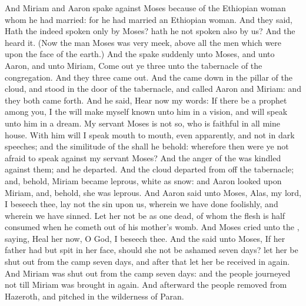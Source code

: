\begin{biblechapter} %
 And Miriam and Aaron spake against Moses because of the Ethiopian woman whom he had married: for he had married an Ethiopian woman.
\verse And they said, Hath the \LORD indeed spoken only by Moses? hath he not spoken also by us? And the \LORD heard it.
\verse (Now the man Moses was very meek, above all the men which were upon the face of the earth.)
\verse And the \LORD spake suddenly unto Moses, and unto Aaron, and unto Miriam, Come out ye three unto the tabernacle of the congregation. And they three came out.
\verse And the \LORD came down in the pillar of the cloud, and stood in the door of the tabernacle, and called Aaron and Miriam: and they both came forth.
\verse And he said, Hear now my words: If there be a prophet among you, I the \LORD will make myself known unto him in a vision, and will speak unto him in a dream.
\verse My servant Moses is not so, who is faithful in all mine house.
\verse With him will I speak mouth to mouth, even apparently, and not in dark speeches; and the similitude of the \LORD shall he behold: wherefore then were ye not afraid to speak against my servant Moses?
\verse And the anger of the \LORD was kindled against them; and he departed.
\verse And the cloud departed from off the tabernacle; and, behold, Miriam became leprous, white as snow: and Aaron looked upon Miriam, and, behold, she was leprous.
\verse And Aaron said unto Moses, Alas, my lord, I beseech thee, lay not the sin upon us, wherein we have done foolishly, and wherein we have sinned.
\verse Let her not be as one dead, of whom the flesh is half consumed when he cometh out of his mother's womb.
\verse And Moses cried unto the \LORD, saying, Heal her now, O God, I beseech thee.
\verse And the \LORD said unto Moses, If her father had but spit in her face, should she not be ashamed seven days? let her be shut out from the camp seven days, and after that let her be received in again.
\verse And Miriam was shut out from the camp seven days: and the people journeyed not till Miriam was brought in again.
\verse And afterward the people removed from Hazeroth, and pitched in the wilderness of Paran.
\end{biblechapter}

